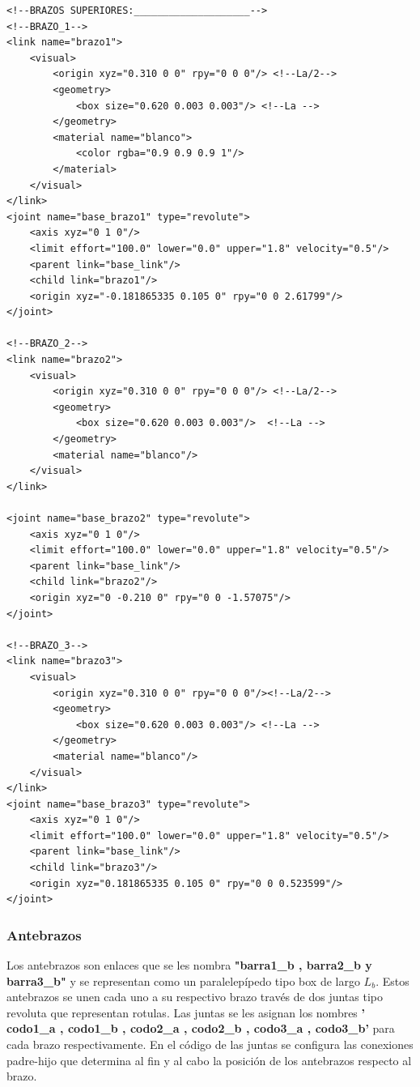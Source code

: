         \lstset{language=XML}
        \begin{lstlisting}
<!--BRAZOS SUPERIORES:____________________-->
<!--BRAZO_1-->
<link name="brazo1">
	<visual>
		<origin xyz="0.310 0 0" rpy="0 0 0"/> <!--La/2-->
		<geometry>
			<box size="0.620 0.003 0.003"/> <!--La -->
		</geometry>
		<material name="blanco">
			<color rgba="0.9 0.9 0.9 1"/>
		</material>
	</visual>
</link>
<joint name="base_brazo1" type="revolute">
	<axis xyz="0 1 0"/>
	<limit effort="100.0" lower="0.0" upper="1.8" velocity="0.5"/>
	<parent link="base_link"/>
	<child link="brazo1"/>
	<origin xyz="-0.181865335 0.105 0" rpy="0 0 2.61799"/> 
</joint>

<!--BRAZO_2-->
<link name="brazo2">
	<visual>
		<origin xyz="0.310 0 0" rpy="0 0 0"/> <!--La/2-->
		<geometry>
			<box size="0.620 0.003 0.003"/>  <!--La -->
		</geometry>
		<material name="blanco"/>
	</visual>
</link>

<joint name="base_brazo2" type="revolute">
	<axis xyz="0 1 0"/>
	<limit effort="100.0" lower="0.0" upper="1.8" velocity="0.5"/>
	<parent link="base_link"/>
	<child link="brazo2"/>
	<origin xyz="0 -0.210 0" rpy="0 0 -1.57075"/> 
</joint>

<!--BRAZO_3-->
<link name="brazo3">
	<visual>
		<origin xyz="0.310 0 0" rpy="0 0 0"/><!--La/2-->
		<geometry>
			<box size="0.620 0.003 0.003"/> <!--La -->
		</geometry>
		<material name="blanco"/>
	</visual>
</link>
<joint name="base_brazo3" type="revolute">
	<axis xyz="0 1 0"/>
	<limit effort="100.0" lower="0.0" upper="1.8" velocity="0.5"/>
	<parent link="base_link"/>
	<child link="brazo3"/>
	<origin xyz="0.181865335 0.105 0" rpy="0 0 0.523599"/> 
</joint>
        \end{lstlisting}
        
        \newpage

       
       \subsubsection{Antebrazos}
       
        Los antebrazos son enlaces que se les nombra \textbf{"barra1\_b , barra2\_b y barra3\_b"} y se representan como un paralelepípedo tipo box de largo \textbf{$L_b$}. Estos antebrazos se unen cada uno a su respectivo brazo través de dos juntas tipo revoluta que representan rotulas. Las juntas se les asignan los nombres \textbf{' codo1\_a , codo1\_b , codo2\_a , codo2\_b , codo3\_a , codo3\_b'} para cada brazo respectivamente. En el código de las juntas se configura las conexiones padre-hijo que determina al fin y al cabo la posición de los antebrazos respecto al brazo.
        
